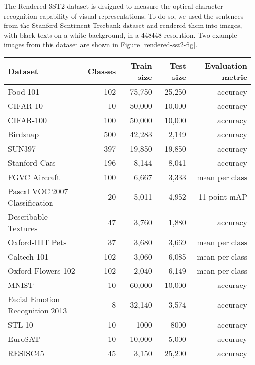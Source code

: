 \documentclass{article}
\begin{document}
The Rendered SST2 dataset is designed to measure the optical character recognition capability of visual representations. To do so, we used the sentences from the Stanford Sentiment Treebank dataset \citep{socher2013recursive} and rendered them into images, with black texts on a white background, in a 448448 resolution. Two example images from this dataset are shown in Figure \ref{rendered-sst2-fig}.

\begin{figure*}[t]
    \centering
    \qquad
    \caption{Two example images from the Rendered SST2 dataset}
    \label{rendered-sst2-fig}
\end{figure*}


\begin{table*}[t]
\centering
\begin{tabular}{lrrrr}
\toprule
    Dataset & Classes & Train size & Test size & Evaluation metric \\
\midrule
Food-101 & 102 & 75,750 & 25,250 & accuracy \\
CIFAR-10 & 10 & 50,000 & 10,000 & accuracy \\
CIFAR-100 & 100 & 50,000 & 10,000 & accuracy \\
Birdsnap & 500 & 42,283 & 2,149 & accuracy \\
SUN397 & 397 & 19,850 & 19,850 & accuracy \\
Stanford Cars & 196 & 8,144 & 8,041 & accuracy \\
FGVC Aircraft & 100 & 6,667 & 3,333 & mean per class \\
Pascal VOC 2007 Classification & 20 & 5,011 & 4,952 & 11-point mAP \\
Describable Textures & 47 & 3,760 & 1,880 & accuracy \\
Oxford-IIIT Pets & 37 & 3,680 & 3,669 & mean per class \\
Caltech-101 & 102 & 3,060 & 6,085 & mean-per-class \\
Oxford Flowers 102 & 102 & 2,040 & 6,149 & mean per class \\
\midrule
MNIST & 10 & 60,000 & 10,000 & accuracy \\
Facial Emotion Recognition 2013 & 8 & 32,140 & 3,574 & accuracy \\
STL-10 & 10 & 1000 & 8000 & accuracy \\
EuroSAT & 10 & 10,000 & 5,000 & accuracy \\
RESISC45 & 45 & 3,150 & 25,200 & accuracy \\

\end{tabular}
\end{table*}
\end{document}
